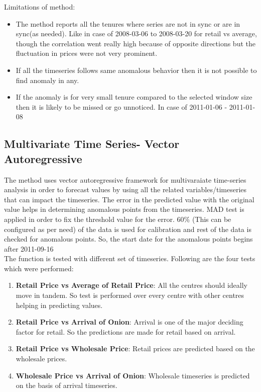 \documentclass[a4paper,10pt]{report}
\begin{document}
		Limitations of method:
		\begin{itemize}
			\item The method reports all the tenures where series are not in sync or are in sync(as needed). Like in case of  2008-03-06 to 2008-03-20 for retail vs average, though the correlation went really high because of opposite directions but the fluctuation in prices were not very prominent.
			\item If all the timeseries follows same anomalous behavior then it is not possible to find anomaly in any.
			\item If the anomaly is for very small tenure compared to the selected window size then it is likely to be missed or go unnoticed. In case of 2011-01-06 - 2011-01-08
		\end{itemize}

\subsection{Multivariate Time Series- Vector Autoregressive}

		The method uses vector autoregressive framework for multivaraiate time-series analysis in order to forecast values by using all the related variables/timeseries that can impact the timeseries. The error in the predicted value with the original value helps in determining anomalous points from the timeseries. MAD test is applied in order to fix the threshold value for the error.
		60\% (This can be configured as per need) of the data is used for calibration and rest of the data is checked for anomalous points. So, the start date for the anomalous points begins after 2011-09-16
		\\
		The function is tested with different set of timeseries. Following are the four tests which were performed:
		\begin{enumerate}
		    \item \textbf{Retail Price vs Average of Retail Price}: All the centres should ideally move in tandem. So test is performed over every centre with other centres helping in predicting values.            
		    \item \textbf{Retail Price vs Arrival of Onion}: Arrival is one of the major deciding factor for retail. So the predictions are made for retail based on arrival.
		    \item \textbf{Retail Price vs Wholesale Price}: Retail prices are predicted based on the wholesale prices.
		    \item \textbf{Wholesale Price vs Arrival of Onion}: Wholesale timeseries is predicted on the basis of arrival timeseries.
		\end{enumerate}
		
\end{document}
